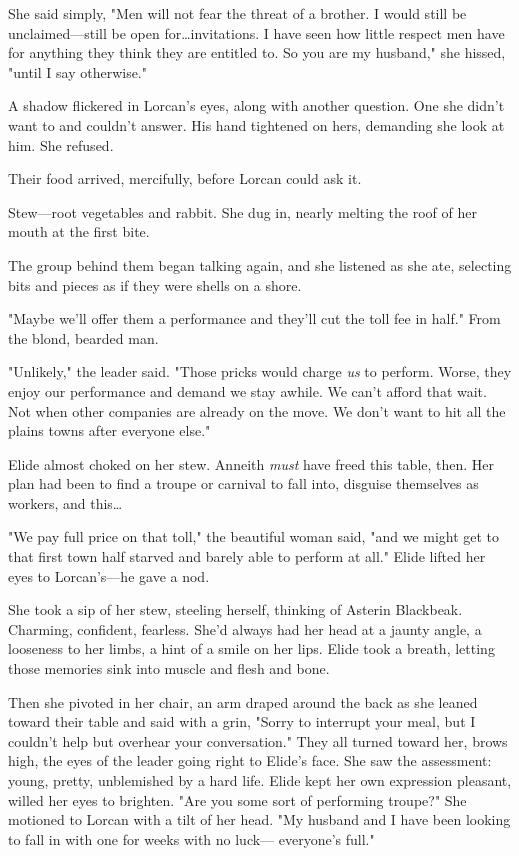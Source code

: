 She said simply, "Men will not fear the threat of a brother.
I would still be unclaimed---still be open for\ldots invitations.
I have seen how little respect men have for anything they think they are entitled to.
So you are my husband," she hissed, "until I say otherwise."

A shadow flickered in Lorcan's eyes, along with another question.
One she didn't want to and couldn't answer.
His hand tightened on hers, demanding she look at him.
She refused.

Their food arrived, mercifully, before Lorcan could ask it.

Stew---root vegetables and rabbit.
She dug in, nearly melting the roof of her mouth at the first bite.

The group behind them began talking again, and she listened as she ate, selecting bits and pieces as if they were shells on a shore.

"Maybe we'll offer them a performance and they'll cut the toll fee in half."
From the blond, bearded man.

"Unlikely," the leader said.
"Those pricks would charge \emph{us} to perform.
Worse, they enjoy our performance and demand we stay awhile.
We can't afford that wait.
Not when other companies are already on the move.
We don't want to hit all the plains towns after everyone else."

Elide almost choked on her stew.
Anneith \emph{must} have freed this table, then.
Her plan had been to find a troupe or carnival to fall into, disguise themselves as workers, and this\ldots{}

"We pay full price on that toll," the beautiful woman said, "and we might get to that first town half starved and barely able to perform at all."
Elide lifted her eyes to Lorcan's---he gave a nod.

She took a sip of her stew, steeling herself, thinking of Asterin Blackbeak.
Charming, confident, fearless.
She'd always had her head at a jaunty angle, a looseness to her limbs, a hint of a smile on her lips.
Elide took a breath, letting those memories sink into muscle and flesh and bone.

Then she pivoted in her chair, an arm draped around the back as she leaned toward their table and said with a grin, "Sorry to interrupt your meal, but I couldn't help but overhear your conversation."
They all turned toward her, brows high, the eyes of the leader going right to Elide's face.
She saw the assessment: young, pretty, unblemished by a hard life.
Elide kept her own expression pleasant, willed her eyes to brighten.
"Are you some sort of performing troupe?"
She motioned to Lorcan with a tilt of her head.
"My husband and I have been looking to fall in with one for weeks with no luck--- everyone's full."

